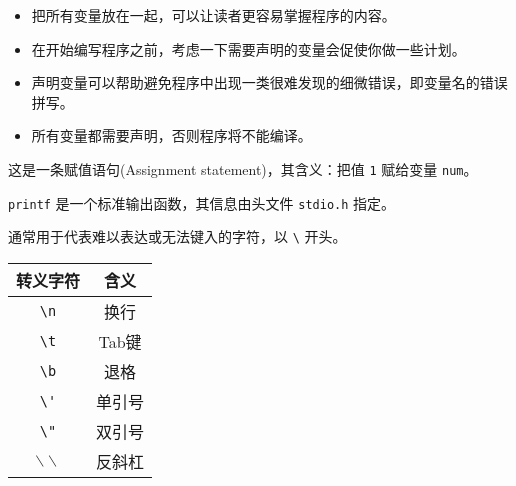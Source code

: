 \begin{frame}[fragile]
\begin{itemize} 
\item 把所有变量放在一起，可以让读者更容易掌握程序的内容。
\\[0.1in]
\item  在开始编写程序之前，考虑一下需要声明的变量会促使你做一些计划。\\[0.1in]
\item  声明变量可以帮助避免程序中出现一类很难发现的细微错误，即变量名的错误拼写。\\[0.1in]
\item  所有变量都需要声明，否则程序将不能编译。
\end{itemize}
\end{frame}


\begin{frame}[fragile]


 
这是一条赋值语句(Assignment statement)，其含义：把值 \lstinline|1| 赋给变量 \lstinline|num|。
 
\end{frame}


\begin{frame}[fragile]

 

\lstinline|printf| 是一个标准输出函数，其信息由头文件 \lstinline|stdio.h| 指定。
%
% 
\end{frame}


\begin{frame}[fragile]
 
通常用于代表难以表达或无法键入的字符，以 \lstinline|\| 开头。
 
\begin{table}
\centering
\begin{tabular}{c|c} \hline
转义字符 & 含义 \\[.1in] \hline  
\lstinline|\n| & 换行\\[.1in]
\lstinline|\t| & Tab键\\[.1in]
\lstinline|\b| & 退格\\[.1in]
\lstinline|\'| & 单引号\\[.1in]
\lstinline|\"| & 双引号\\[.1in]
$\backslash\backslash$ & 反斜杠\\[.1in]
\hline 
\end{tabular}
\end{table}
\end{frame}


